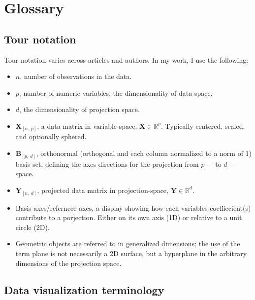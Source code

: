\documentclass{monashthesis}
\begin{document}
\chapter{Glossary}\label{ch:glossary}

\section{Tour notation}\label{sec:tour_notation}

Tour notation varies across articles and authors. In my work, I use the
following:

\begin{itemize}
\tightlist
\item
  \(n\), number of observations in the data.
\item
  \(p\), number of numeric variables, the dimensionality of data space.
\item
  \(d\), the dimensionality of projection space.
\item
  \(\textbf{X}_{[n,~p]}\), a data matrix in variable-space,
  \(\textbf{X} \in \mathbb{R}^{p}\). Typically centered, scaled, and
  optionally sphered.
\item
  \(\textbf{B}_{[p,~d]}\), orthonormal (orthogonal and each column
  normalized to a norm of 1) basis set, defining the axes directions for
  the projection from \(p-\) to \(d-\)space.
\item
  \(\textbf{Y}_{[n,~d]}\), projected data matrix in projection-space,
  \(\textbf{Y} \in \mathbb{R}^{d}\).
\item
  Basis axes/refernece axes, a display showing how each variables
  coeffiecient(s) contribute to a porjection. Either on its own axis
  (1D) or relative to a unit circle (2D).
\item
  Geometric objects are referred to in generalized dimensions; the use
  of the term plane is not necessarily a 2D surface, but a hyperplane in
  the arbitrary dimensions of the projection space.
\end{itemize}

\section{Data visualization terminology}\label{sec:3d-terminology}
\end{document}
